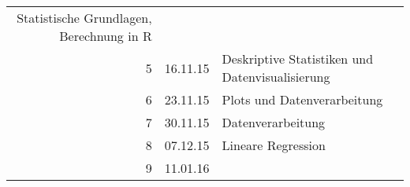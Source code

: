\documentclass[]{article}
\renewcommand{\[}{\begin{equation}}
\renewcommand{\]}{\end{equation}}
\newcommand{\R}{\textsf{R}}
\begin{document}
\begin{longtable}[c]{@{}rll@{}}
\begin{minipage}[t]{0.42\columnwidth}
Statistische Grundlagen, Berechnung in \R{}
\strut\end{minipage}\tabularnewline
\begin{minipage}[t]{0.18\columnwidth}\raggedleft\strut
5
\strut\end{minipage} &
\begin{minipage}[t]{0.18\columnwidth}\raggedright\strut
16.11.15
\strut\end{minipage} &
\begin{minipage}[t]{0.42\columnwidth}\raggedright\strut
Deskriptive Statistiken und Datenvisualisierung
\strut\end{minipage}\tabularnewline
\begin{minipage}[t]{0.18\columnwidth}\raggedleft\strut
6
\strut\end{minipage} &
\begin{minipage}[t]{0.18\columnwidth}\raggedright\strut
23.11.15
\strut\end{minipage} &
\begin{minipage}[t]{0.42\columnwidth}\raggedright\strut
Plots und Datenverarbeitung
\strut\end{minipage}\tabularnewline
\begin{minipage}[t]{0.18\columnwidth}\raggedleft\strut
7
\strut\end{minipage} &
\begin{minipage}[t]{0.18\columnwidth}\raggedright\strut
30.11.15
\strut\end{minipage} &
\begin{minipage}[t]{0.42\columnwidth}\raggedright\strut
Datenverarbeitung
\strut\end{minipage}\tabularnewline
\begin{minipage}[t]{0.18\columnwidth}\raggedleft\strut
8
\strut\end{minipage} &
\begin{minipage}[t]{0.18\columnwidth}\raggedright\strut
07.12.15
\strut\end{minipage} &
\begin{minipage}[t]{0.42\columnwidth}\raggedright\strut
Lineare Regression
\strut\end{minipage}\tabularnewline
\begin{minipage}[t]{0.18\columnwidth}\raggedleft\strut
9
\strut\end{minipage} &
\begin{minipage}[t]{0.18\columnwidth}\raggedright\strut
11.01.16
\strut\end{minipage} &
\begin{minipage}[t]{0.42\columnwidth}\raggedright\strut

\end{minipage}
\end{longtable}
\end{document}
